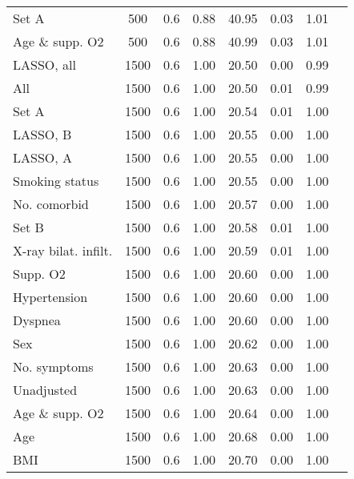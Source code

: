 \documentclass{article}
\begin{document}
{\begin{longtable}{lccccccc}
Set A & 500 & 0.6 & 0.88 & 40.95 & 0.03 & 1.01\\
Age \& supp. O2 & 500 & 0.6 & 0.88 & 40.99 & 0.03 & 1.01\\ \midrule
LASSO, all & 1500 & 0.6 & 1.00 & 20.50 & 0.00 & 0.99\\
All & 1500 & 0.6 & 1.00 & 20.50 & 0.01 & 0.99\\
Set A & 1500 & 0.6 & 1.00 & 20.54 & 0.01 & 1.00\\
LASSO, B & 1500 & 0.6 & 1.00 & 20.55 & 0.00 & 1.00\\
LASSO, A & 1500 & 0.6 & 1.00 & 20.55 & 0.00 & 1.00\\
Smoking status & 1500 & 0.6 & 1.00 & 20.55 & 0.00 & 1.00\\
No. comorbid & 1500 & 0.6 & 1.00 & 20.57 & 0.00 & 1.00\\
Set B & 1500 & 0.6 & 1.00 & 20.58 & 0.01 & 1.00\\
X-ray bilat. infilt. & 1500 & 0.6 & 1.00 & 20.59 & 0.01 & 1.00\\
Supp. O2 & 1500 & 0.6 & 1.00 & 20.60 & 0.00 & 1.00\\
Hypertension & 1500 & 0.6 & 1.00 & 20.60 & 0.00 & 1.00\\
Dyspnea & 1500 & 0.6 & 1.00 & 20.60 & 0.00 & 1.00\\
Sex & 1500 & 0.6 & 1.00 & 20.62 & 0.00 & 1.00\\
No. symptoms & 1500 & 0.6 & 1.00 & 20.63 & 0.00 & 1.00\\
Unadjusted & 1500 & 0.6 & 1.00 & 20.63 & 0.00 & 1.00\\
Age \& supp. O2 & 1500 & 0.6 & 1.00 & 20.64 & 0.00 & 1.00\\
Age & 1500 & 0.6 & 1.00 & 20.68 & 0.00 & 1.00\\
BMI & 1500 & 0.6 & 1.00 & 20.70 & 0.00 & 1.00\\
\bottomrule
\hline
\end{longtable}
}

\clearpage
\end{document}
